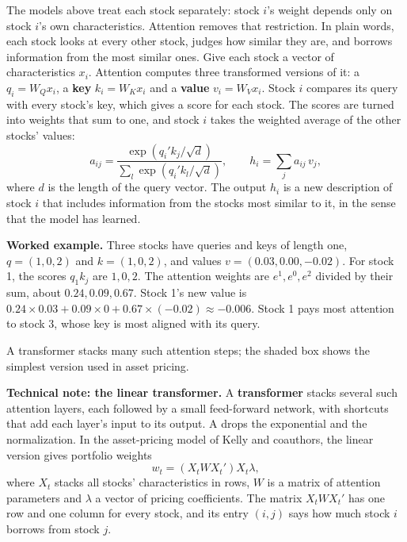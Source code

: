 The models above treat each stock separately: stock $i$'s weight depends only on stock $i$'s own characteristics. Attention removes that restriction. In plain words, each stock looks at every other stock, judges how similar they are, and borrows information from the most similar ones. Give each stock a vector of characteristics $x_i$. Attention computes three transformed versions of it: a  $q_i = W_Q x_i$, a \textbf{key} $k_i = W_K x_i$ and a \textbf{value} $v_i = W_V x_i$. Stock $i$ compares its query with every stock's key, which gives a score for each stock. The scores are turned into weights that sum to one, and stock $i$ takes the weighted average of the other stocks' values:
\begin{equation}
  a_{ij} = \frac{\exp\left(q_i' k_j/\sqrt{d}\right)}{\sum_{l} \exp\left(q_i' k_l/\sqrt{d}\right)}, \qquad h_i = \sum_{j} a_{ij}\, v_j,
  \label{eq:22-attention}
\end{equation}
where $d$ is the length of the query vector. The output $h_i$ is a new description of stock $i$ that includes information from the stocks most similar to it, in the sense that the model has learned.

\textbf{Worked example.} Three stocks have queries and keys of length one, $q = (1, 0, 2)$ and $k = (1, 0, 2)$, and values $v = (0.03, 0.00, -0.02)$. For stock 1, the scores $q_1 k_j$ are $1, 0, 2$. The attention weights are $e^1, e^0, e^2$ divided by their sum, about $0.24, 0.09, 0.67$. Stock 1's new value is $0.24 \times 0.03 + 0.09 \times 0 + 0.67 \times (-0.02) \approx -0.006$. Stock 1 pays most attention to stock 3, whose key is most aligned with its query.

A transformer stacks many such attention steps; the shaded box shows the simplest version used in asset pricing.

\begin{technote}
\textbf{Technical note: the linear transformer.} A \textbf{transformer} stacks several such attention layers, each followed by a small feed-forward network, with shortcuts that add each layer's input to its output. A  drops the exponential and the normalization. In the asset-pricing model of Kelly and coauthors, the linear version gives portfolio weights
\begin{equation}
  w_t = \left(X_t W X_t'\right) X_t \lambda,
  \label{eq:22-linear}
\end{equation}
where $X_t$ stacks all stocks' characteristics in rows, $W$ is a matrix of attention parameters and $\lambda$ a vector of pricing coefficients. The matrix $X_t W X_t'$ has one row and one column for every stock, and its entry $(i,j)$ says how much stock $i$ borrows from stock $j$.
\end{technote}

